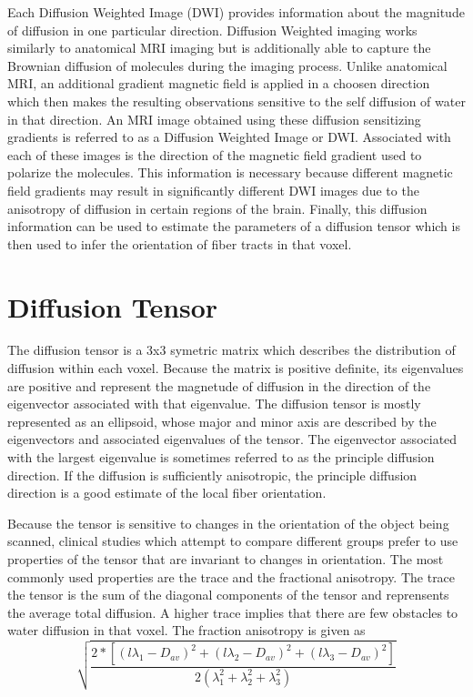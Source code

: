 Each Diffusion Weighted Image (DWI) provides information about the magnitude of diffusion in one particular direction.  Diffusion Weighted imaging works similarly to anatomical MRI imaging but is additionally able to capture the Brownian diffusion of molecules during the imaging process.  Unlike anatomical MRI, an additional gradient magnetic field is applied in a choosen direction which then makes the resulting observations sensitive to the self diffusion of water in that direction. An MRI image obtained using these diffusion sensitizing gradients is referred to as a Diffusion Weighted Image or DWI.  Associated with each of these images is the direction of the magnetic field gradient used to polarize the molecules.  This information is necessary because different magnetic field gradients may result in significantly different DWI images due to the anisotropy of diffusion in certain regions of the brain.  Finally, this diffusion information can be used to estimate the parameters of a diffusion tensor which is then used to infer the orientation of fiber tracts in that voxel.

\section{Diffusion Tensor}
The diffusion tensor is a 3x3 symetric matrix which describes the distribution of diffusion within each voxel.  Because the matrix is positive definite, its eigenvalues are positive and represent the magnetude of diffusion in the direction of the eigenvector associated with that eigenvalue.  The diffusion tensor is mostly represented as an ellipsoid, whose major and minor axis are described by the eigenvectors and associated eigenvalues of the tensor.  The eigenvector associated with the largest eigenvalue is sometimes referred to as the principle diffusion direction.  If the diffusion is sufficiently anisotropic, the principle diffusion direction is a good estimate of the local fiber orientation. %

Because the tensor is sensitive to changes in the orientation of the object being scanned, clinical studies which attempt to compare different groups prefer to use properties of the tensor that are invariant to changes in orientation.  The most commonly used properties are the trace and the fractional anisotropy.  The trace the tensor is the sum of the diagonal components of the tensor and reprensents the average total diffusion.  A higher trace implies that there are few obstacles to water diffusion in that voxel.  The fraction anisotropy is given as
\begin{equation} \label{eq:tensormodel}
\sqrt{\frac{2*[(l\lambda_1-D_{av})^2 + (l\lambda_2-D_{av})^2 + (l\lambda_3-D_{av})^2]}
{2(\lambda_1^2+\lambda_2^2+\lambda_3^2)}}
\end{equation}

